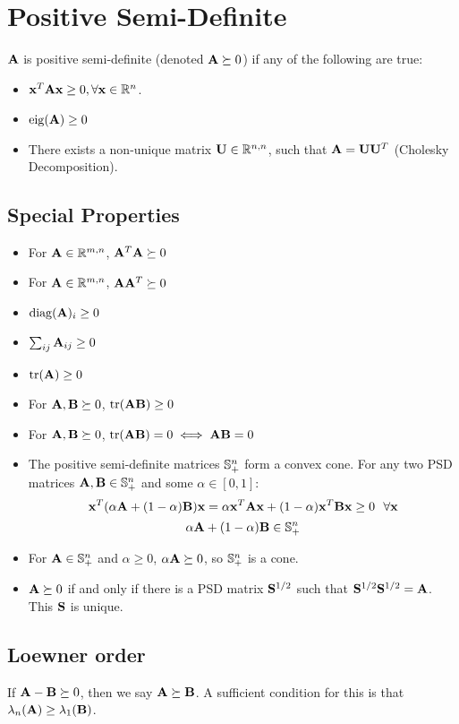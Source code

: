 \section{Positive Semi-Definite}

$\mathbf{A}$ is positive semi-definite (denoted $\mathbf{A}\succeq0$) if any of the following are true:
\begin{itemize}
\item $\mathbf{x}^T\mathbf{A}\mathbf{x}\ge0,\forall\mathbf{x}\in\mathbb{R}^{n}$.
\item $\operatorname{eig}(\mathbf{A})\ge0$
\item There exists a non-unique matrix $\mathbf{U}\in\mathbb{R}^{n,n}$, such that $\mathbf{A}=\mathbf{U}\mathbf{U}^T$ (Cholesky Decomposition). %
\end{itemize}

\subsection*{Special Properties}
\begin{itemize}
\item For $\mathbf{A}\in\mathbb{R}^{m,n}$, $\mathbf{A}^T\mathbf{A}\succeq0$
\item For $\mathbf{A}\in\mathbb{R}^{m,n}$, $\mathbf{A}\mathbf{A}^T\succeq0$
\item $\operatorname{diag}(\mathbf{A})_i\ge0$
\item $\sum_{ij} \mathbf{A}_{ij}\ge0$
\item $\operatorname{tr}(\mathbf{A})\ge0$
\item For $\mathbf{A},\mathbf{B}\succeq0$, $\operatorname{tr}(\mathbf{A}\mathbf{B})\ge0$
\item For $\mathbf{A},\mathbf{B}\succeq0$, $\operatorname{tr}(\mathbf{A}\mathbf{B})=0\iff \mathbf{A}\mathbf{B}=0$
\item The positive semi-definite matrices $\mathbb{S}^n_+$ form a convex cone. For any two PSD matrices $\mathbf{A},\mathbf{B}\in\mathbb{S}^n_+$ and some $\alpha\in[0,1]$:
\begin{equation}
\mathbf{x}^T(\alpha\mathbf{A}+(1-\alpha)\mathbf{B})\mathbf{x}=\alpha \mathbf{x}^T\mathbf{A}\mathbf{x}+(1-\alpha)\mathbf{x}^T\mathbf{B}\mathbf{x}\ge0~~\forall\mathbf{x}
\end{equation}
\begin{equation}
\alpha\mathbf{A}+(1-\alpha)\mathbf{B}\in\mathbb{S}^n_+
\end{equation}
\item For $\mathbf{A}\in\mathbb{S}^n_+$ and $\alpha\ge0$, $\alpha\mathbf{A}\succeq0$, so $\mathbb{S}^n_+$ is a cone.
\item $\mathbf{A}\succeq 0$ if and only if there is a PSD matrix $\mathbf{S}^{1/2}$ such that $\mathbf{S}^{1/2}\mathbf{S}^{1/2}=\mathbf{A}$. This $\mathbf{S}$ is unique.
\end{itemize}

\subsection{Loewner order}
If $\mathbf{A}-\mathbf{B}\succeq 0$, then we say $\mathbf{A}\succeq \mathbf{B}$. A sufficient condition for this is that $\lambda_n(\mathbf{A})\ge\lambda_1(\mathbf{B})$.



